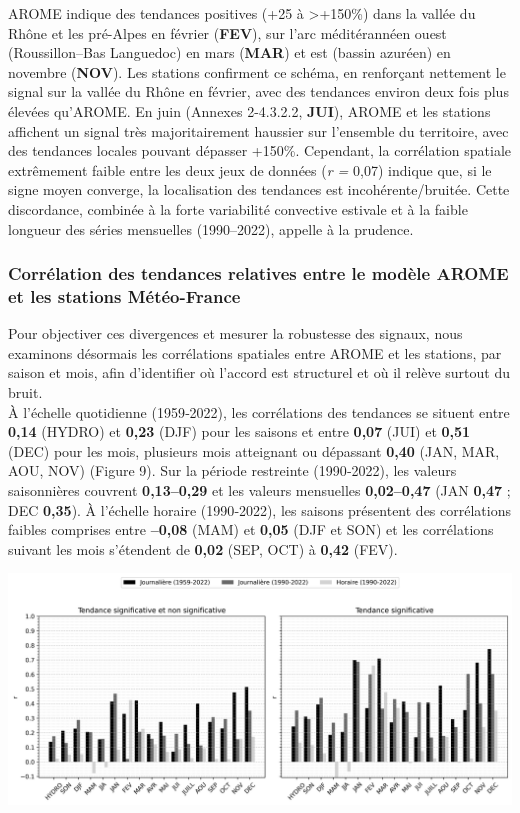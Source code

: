 \documentclass[
  article,
  nofooter,
  noheadings]{jss}
\begin{document}
\hfill\break

AROME indique des tendances positives (+25 à \textgreater+150\%) dans la
vallée du Rhône et les pré-Alpes en février (\textbf{FEV}), sur l'arc
méditérannéen ouest (Roussillon--Bas Languedoc) en mars (\textbf{MAR})
et est (bassin azuréen) en novembre (\textbf{NOV}). Les stations
confirment ce schéma, en renforçant nettement le signal sur la vallée du
Rhône en février, avec des tendances environ deux fois plus élevées
qu'AROME. En juin (Annexes 2-4.3.2.2, \textbf{JUI}), AROME et les
stations affichent un signal très majoritairement haussier sur
l'ensemble du territoire, avec des tendances locales pouvant dépasser
+150\%. Cependant, la corrélation spatiale extrêmement faible entre les
deux jeux de données (\emph{r =} 0,07) indique que, si le signe moyen
converge, la localisation des tendances est incohérente/bruitée. Cette
discordance, combinée à la forte variabilité convective estivale et à la
faible longueur des séries mensuelles (1990--2022), appelle à la
prudence.

\subsubsection{Corrélation des tendances relatives entre le modèle AROME
et les stations
Météo-France}\label{corruxe9lation-des-tendances-relatives-entre-le-moduxe8le-arome-et-les-stations-muxe9tuxe9o-france}

Pour objectiver ces divergences et mesurer la robustesse des signaux,
nous examinons désormais les corrélations spatiales entre AROME et les
stations, par saison et mois, afin d'identifier où l'accord est
structurel et où il relève surtout du bruit.\\

À l'échelle quotidienne (1959‑2022), les corrélations des tendances se
situent entre \textbf{0,14} (HYDRO) et \textbf{0,23} (DJF) pour les
saisons et entre \textbf{0,07} (JUI) et \textbf{0,51} (DEC) pour les
mois, plusieurs mois atteignant ou dépassant \textbf{0,40} (JAN, MAR,
AOU, NOV) (Figure 9). Sur la période restreinte (1990‑2022), les valeurs
saisonnières couvrent \textbf{0,13--0,29} et les valeurs mensuelles
\textbf{0,02--0,47} (JAN \textbf{0,47} ; DEC \textbf{0,35}). À l'échelle
horaire (1990‑2022), les saisons présentent des corrélations faibles
comprises entre \textbf{--0,08} (MAM) et \textbf{0,05} (DJF et SON) et
les corrélations suivant les mois s'étendent de \textbf{0,02} (SEP, OCT)
à \textbf{0,42} (FEV).

\includegraphics[width=1\linewidth,height=\textheight,keepaspectratio]{figures/histo_z_T_p.png}
\end{document}
